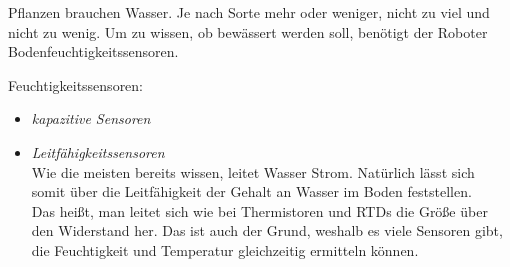		Pflanzen brauchen Wasser. Je nach Sorte mehr oder weniger, nicht zu viel und nicht zu wenig. Um zu wissen, ob bewässert werden soll, benötigt der Roboter Bodenfeuchtigkeitssensoren.
		
		\begin{description}
			\item {Feuchtigkeitssensoren:}
			\begin{itemize}
				\item {\textit{kapazitive Sensoren}}\\
				
				\item {\textit{Leitfähigkeitssensoren}}\\
				Wie die meisten bereits wissen, leitet Wasser Strom. Natürlich lässt sich somit über die Leitfähigkeit der Gehalt an Wasser im Boden feststellen.\\
				Das heißt, man leitet sich wie bei Thermistoren und RTDs die Größe über den Widerstand her. Das ist auch der Grund, weshalb es viele Sensoren gibt, die Feuchtigkeit und Temperatur gleichzeitig ermitteln können.
			\end{itemize}
		\end{description}
		